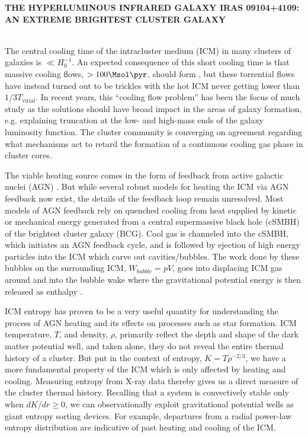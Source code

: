 \documentclass[letterpaper,11pt,twocolumn]{article}
\begin{document}
\pagestyle{plain}

\begin{center}
\bfseries\uppercase{The Hyperluminous Infrared Galaxy IRAS 09104+4109: An Extreme Brightest Cluster Galaxy}
\end{center}

\\
The central cooling time of the intracluster medium (ICM) in many
clusters of galaxies is $\ll H_0^{-1}$. An expected consequence of
this short cooling time is that massive cooling flows, $> 100 \Msol
\pyr$, should form \citep{1977MNRAS.180..479F}, but these torrential
flows have instead turned out to be trickles \citep{peterson2001} with
the hot ICM never getting lower than $1/3 T_{\mathrm{virial}}$. In
recent years, this ``cooling flow problem'' has been the focus of much
study as the solutions should have broad impact in the areas of
galaxy formation, e.g. explaining truncation at the low- and
high-mass ends of the galaxy luminosity function. The cluster
community is converging on agreement regarding what mechanisms act to
retard the formation of a continuous cooling gas phase in cluster
cores.

The viable heating source comes in the form of feedback from active
galactic nuclei (AGN) \citep{hoticmrev}. But while several
robust models for heating the ICM via AGN feedback now exist, the
details of the feedback loop remain unresolved. Most models of AGN
feedback rely on quenched cooling from heat supplied by kinetic or
mechanical energy generated from a central supermassive black hole
(cSMBH) of the brightest cluster galaxy (BCG). Cool gas is channeled
into the cSMBH, which initiates an AGN feedback cycle, and is followed
by ejection of high energy particles into the ICM which carve out
cavities/bubbles. The work done by these bubbles on the surrounding
ICM, $W_{bubble} = pV$, goes into displacing ICM gas around and into
the bubble wake where the gravitational potential energy is then
released as enthalpy \citep{2004ApJ...607..800B}.

ICM entropy has proven to be a very useful quantity for understanding
the process of AGN heating and its effects on processes such as star
formation. ICM temperature, $T$, and density, $\rho$, primarily
reflect the depth and shape of the dark matter potential well, and
taken alone, they do not reveal the entire thermal history of a
cluster. But put in the context of entropy, $K=T\rho^{-2/3}$, we have
a more fundamental property of the ICM which is only affected by
heating and cooling. Measuring entropy from X-ray data thereby gives
us a direct measure of the cluster thermal history. Recalling that a
system is convectively stable only when $dK/dr \geq 0$, we can
observationally exploit gravitational potential wells as giant entropy
sorting devices. For example, departures from a radial power-law
entropy distribution are indicative of past heating and cooling of the
ICM.
\end{document}
